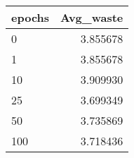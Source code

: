 \begin{tabular}{lr}
\toprule
epochs &  Avg\_waste \\
\midrule
     0 &   3.855678 \\
     1 &   3.855678 \\
    10 &   3.909930 \\
    25 &   3.699349 \\
    50 &   3.735869 \\
   100 &   3.718436 \\
\bottomrule
\end{tabular}
